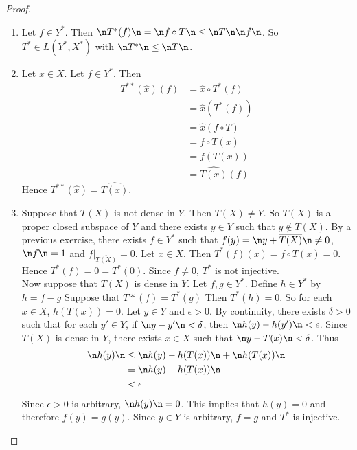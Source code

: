 \documentclass[12pt]{amsart}
\newcommand{\del}{\delta}
\newcommand{\ep}{\epsilon}
\begin{document}
\begin{proof}
	\begin{enumerate}
		\item Let $f \in Y^*$. Then $\n T^* (f) \n = \n f \circ T \n \leq  \n T \n  \n f \n$. So $T^* \in L(Y^*, X^*)$ with $\n T^* \n \leq \n T \n$.\vspace{.5cm}\\
		\item Let $x \in X$. Let $f \in Y^*$. Then 
		\begin{align*}
			T^{**}(\hat{x})(f) 
			&= \hat{x} \circ T^{*}(f) \\
			&= \hat{x}(T^* (f)) \\
			&= \hat{x}(f \circ T) \\
			&= f \circ T (x) \\
			&= f(T(x)) \\
			&= \widehat{T(x)}(f)
		\end{align*} 
		Hence $T^{**}(\hat{x}) = \widehat{T(x)}$.\vspace{.5cm}\\
		\item Suppose that $T(X)$ is not dense in $Y$. Then $\overline{T(X)} \neq Y$. So $T(X)$ is a proper closed subspace of $Y$ and there exists $y \in Y$ such that $y \not \in \overline{T(X)}$. By a previous exercise, there exists $f \in Y^*$ such that $f(y) = \n y+\overline{T(X)} \n \neq 0$, $\n f \n =1$ and $f|_{\overline{T(X)}} = 0$. Let $x \in X$. Then $T^*(f)(x) = f \circ T(x) = 0$. Hence $T^*(f) = 0 = T^*(0)$. Since $f \neq 0$, $T^*$ is not injective.\\ Now suppose that $T(X)$ is dense in $Y$. Let $f,g \in Y^*$. Define $h \in Y^*$ by $h = f-g$ Suppose that $T*(f) = T^*(g)$ Then $T^*(h) = 0$. So for each $x \in X$, $h(T(x)) = 0$. Let $y \in Y$ and $\ep >0$. By continuity, there exists $\del > 0 $ such that for each $y' \in Y$, if $\n y - y' \n < \del$, then $\n h(y) - h(y') \n < \ep$. Since $T(X)$ is dense in $Y$, there exists $x \in X$ such that $\n y - T(x) \n < \del$. Thus 
		\begin{align*}
			\n h (y) \n 
			&\leq \n h(y) - h(T(x)) \n + \n h(T(x)) \n\\
			& = \n h(y) - h(T(x)) \n  \\
			& < \ep
		\end{align*} 
		Since $\ep > 0$ is arbitrary, $\n h(y) \n = 0$. This implies that $h(y) = 0$ and therefore $f(y) = g(y) $. Since $y \in Y$ is arbitrary, $f=g$ and $T^*$ is injective. \vspace{.5cm}\\

\end{enumerate}
\end{proof}
\end{document}
